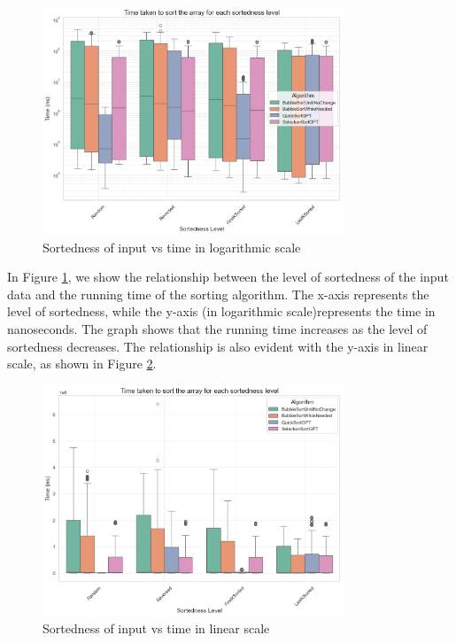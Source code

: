 \documentclass[unicode,11pt,a4paper,oneside,numbers=endperiod,openany]{scrartcl}
\begin{document}
    \begin{figure}[htbp]
        \centering
        \includegraphics[width=0.8\textwidth]{./fig/hip1.png}
        \caption{Sortedness of input vs time in logarithmic scale}
        \label{fig:hip1}
    \end{figure}

    In Figure \ref{fig:hip1}, we show the relationship between the level of sortedness of the input data and the running time of the sorting algorithm. The x-axis represents the level of sortedness, while the y-axis (in logarithmic scale)represents the time in nanoseconds. The graph shows that the running time increases as the level of sortedness decreases. The relationship is also evident with the y-axis in linear scale, as shown in Figure \ref{fig:hip1_linear}.\\
    \hfill

    \begin{figure}[htbp]
        \centering
        \includegraphics[width=0.8\textwidth]{./fig/hip1-nonLog.png}
        \caption{Sortedness of input vs time in linear scale}
        \label{fig:hip1_linear}
    \end{figure}
\end{document}
